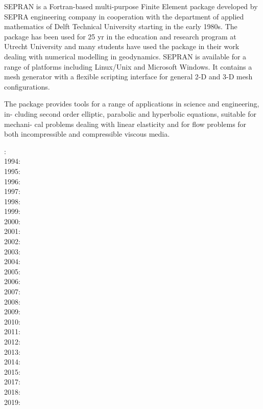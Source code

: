 \begin{itemize}
SEPRAN \cite{sepr05} is a Fortran-based
multi-purpose Finite Element package developed by SEPRA engineering company in
cooperation with the department of applied mathematics of Delft Technical University
starting in the early 1980s. The package has been used for 25 yr in the education and
research program at Utrecht University and many students have used the package in
their work dealing with numerical modelling in geodynamics. SEPRAN is available for
a range of platforms including Linux/Unix and Microsoft Windows. It contains a mesh
generator with a flexible scripting interface for general 2-D and 3-D mesh configurations.

The package provides tools for a range of applications in science and engineering, in-
cluding second order elliptic, parabolic and hyperbolic equations, suitable for mechani-
cal problems dealing with linear elasticity and for flow problems for both incompressible
and compressible viscous media.

{\small
{}: \cite{beky93}\cite{vavy93}\\
1994: \cite{vlvv94}\cite{vayv94}\\
1995: \cite{vayv95}\cite{vayu95}\\
1996: \cite{vayu96}\\
1997: \cite{vayu97}\cite{vank97}\\
1998: \cite{devv98}\\
1999: \cite{devv99}\\
2000: \cite{devv00b}\cite{vavv00}\\
2001: \cite{drvc01}\cite{vavv01}\\
2002: \cite{civv02}\cite{vavv02}\cite{vakp02}\cite{vavv02b}\cite{vaya02}\\
2003: \cite{vavd03}\cite{vabh03}\\
2004: \cite{vavv04}\cite{vavv04b}\cite{vavv04c}\cite{vayr04}\cite{vavv04d}\\
2005: \cite{vavv05}\cite{sepr05}\cite{vary05}\\
2006: \cite{liva06a}\cite{liva06b}\\
2007: \cite{vant07}\cite{civv07}\cite{brva07a}\cite{brva07b}\cite{knvk07}\\
2008: \cite{plva08}\cite{brhv08}\cite{knva08}\cite{vava08}\\
2009: \cite{vavl09}\cite{vavv09}\\
2010: \cite{vahy10}\cite{syva10}\cite{devv10}\cite{vady10}\cite{vayb10}\\
2011: \cite{vahs11}\cite{java11}\cite{vayj11}\\
2012: \cite{besy12}\cite{beva12}\cite{chgv12}\\
2013: \cite{ancv13}\cite{cibi13}\\
2014: \cite{chsg14}\cite{mova14}\cite{chsv14}\\
2015: \cite{vasy15}\cite{cibi15}\\
2017: \cite{civj17}\cite{wewv17}\\
2018: \cite{spcv18}\cite{chss18}\\
2019: \cite{zhdv19}\cite{vayu19}\cite{casv19}\cite{vaws19}
}


\end{itemize}
